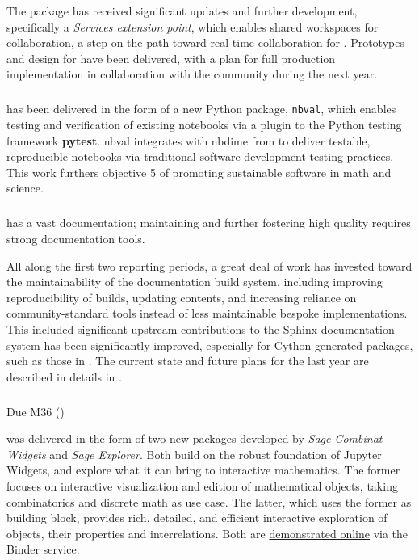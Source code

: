 The \JupyterHub package has received significant updates and further development, specifically a
\emph{Services extension point}, which enables shared workspaces for collaboration, a step on the path
toward real-time collaboration for .
Prototypes and design for  have been delivered,
with a plan for full production implementation in collaboration with the \Jupyter community during the next year.

\subparagraph{}
\label{UI@notebook-verification}

 has been delivered in the form of a new Python package, \texttt{nbval},
which enables testing and verification of existing notebooks via a plugin to the Python testing
framework \textbf{pytest}. nbval integrates with nbdime from  to deliver
testable, reproducible notebooks via traditional software development testing practices.
This work furthers \ODK objective 5 of promoting sustainable software in math and science.

\subparagraph{}
\label{UI@sage-sphinx}

\Sage has a vast documentation; maintaining and further fostering high
quality requires strong documentation tools.

All along the first two reporting periods, a great deal of work has
invested toward the maintainability of the \Sage documentation build
system, including improving reproducibility of builds, updating
contents, and increasing reliance on community-standard tools instead
of less maintainable bespoke implementations. This included
significant upstream contributions to the Sphinx documentation system
has been significantly improved, especially for Cython-generated
packages, such as those in . The current state
and future plans for the last year are described in details in
.

\subparagraph{} Due M36 ()
\label{UI@dynamic-inspect}

 was delivered in the
form of two new packages developed by \ODK \emph{Sage Combinat
  Widgets} and \emph{Sage Explorer}. Both build on the robust
foundation of Jupyter Widgets, and explore what it can bring to
interactive mathematics. The former focuses on interactive
visualization and edition of mathematical objects, taking
combinatorics and discrete math as use case. The latter, which uses
the former as building block, provides rich, detailed, and efficient
interactive exploration of objects, their properties and
interrelations. Both are
\href{https://github.com/sagemath/sage-explorer}{demonstrated online}
via the Binder service.

